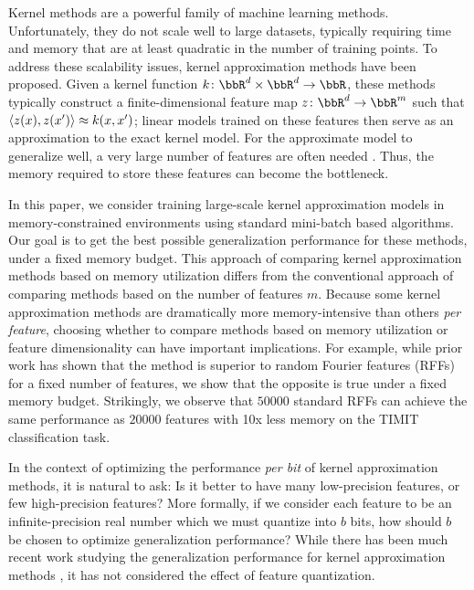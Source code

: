 
Kernel methods are a powerful family of machine learning methods.  Unfortunately, they do not scale well to large datasets, typically requiring time and memory that are at least quadratic in the number of training points. To address these scalability issues, kernel approximation methods have been proposed. Given a kernel function $k\colon\RR^d\times\RR^d\rightarrow \RR$, these methods typically construct a finite-dimensional feature map $z\colon \RR^d \rightarrow \RR^m$ such that $\langle z(x),z(x') \rangle \approx k(x,x')$; linear models trained on these features then serve as an approximation to the exact kernel model. For the approximate model to generalize well, a very large number of features are often needed \citep{rahimi08kitchen,block16,may2017}. Thus, the memory required to store these features can become the bottleneck.

In this paper, we consider training large-scale kernel approximation models in memory-constrained environments using standard mini-batch based algorithms. Our goal is to get the best possible generalization performance for these methods, under a fixed memory budget. This approach of comparing kernel approximation methods based on memory utilization differs from the conventional approach of comparing methods based on the number of features $m$. Because some kernel approximation methods are dramatically more memory-intensive than others \textit{per feature}, choosing whether to compare methods based on memory utilization or feature dimensionality can have important implications. For example, while prior work \citep{nysvsrff12} has shown that the \Nystrom method \citep{nystrom} is superior to random Fourier features (RFFs) \citep{rahimi07random} for a fixed number of features, we show that the opposite is true under a fixed memory budget. Strikingly, we observe that $\num[group-separator={,}]{50000}$ standard RFFs can achieve the same performance as $\num[group-separator={,}]{20000}$ \Nystrom features with 10x less memory on the TIMIT classification task.

In the context of optimizing the performance \textit{per bit} of kernel approximation methods, it is natural to ask: Is it better to have many low-precision features, or few high-precision features? More formally, if we consider each feature to be an infinite-precision real number which we must quantize into $b$ bits, how should $b$ be chosen to optimize generalization performance? While there has been much recent work studying the generalization performance for kernel approximation methods \citep{rudi17,avron17,musco17,bach17}, it has not considered the effect of feature quantization.


